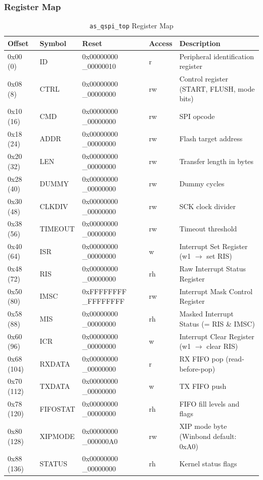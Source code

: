 \subsubsection{Register Map}

\begin{table}[H]
\caption{\texttt{as\_qspi\_top} Register Map}
\label{tab:asqspitop_regmap}
\centering
\begin{tabularx}{\textwidth}{|l|l| X| l| X|}
  \hline
  Offset & Symbol & Reset & Access & Description \\
  \hline\hline
  0x00 (0)   & ID        & 0x00000000 \_00000010 & r   & Peripheral identification register \\
  \hline
  0x08 (8)   & CTRL      & 0x00000000 \_00000000 & rw  & Control register (START, FLUSH, mode bits) \\
  \hline
  0x10 (16)  & CMD       & 0x00000000 \_00000000 & rw  & SPI opcode \\
  \hline
  0x18 (24)  & ADDR      & 0x00000000 \_00000000 & rw  & Flash target address \\
  \hline
  0x20 (32)  & LEN       & 0x00000000 \_00000000 & rw  & Transfer length in bytes \\
  \hline
  0x28 (40)  & DUMMY     & 0x00000000 \_00000000 & rw  & Dummy cycles \\
  \hline
  0x30 (48)  & CLKDIV    & 0x00000000 \_00000000 & rw  & SCK clock divider \\
  \hline
  0x38 (56)  & TIMEOUT   & 0x00000000 \_00000000 & rw  & Timeout threshold \\
  \hline
  0x40 (64)  & ISR       & 0x00000000 \_00000000 & w   & Interrupt Set Register (w1 $\to$ set RIS) \\
  \hline
  0x48 (72)  & RIS       & 0x00000000 \_00000000 & rh  & Raw Interrupt Status Register \\
  \hline
  0x50 (80)  & IMSC      & 0xFFFFFFFF \_FFFFFFFF & rw  & Interrupt Mask Control Register \\
  \hline
  0x58 (88)  & MIS       & 0x00000000 \_00000000 & rh  & Masked Interrupt Status (= RIS \& IMSC) \\
  \hline
  0x60 (96)  & ICR       & 0x00000000 \_00000000 & w   & Interrupt Clear Register (w1 $\to$ clear RIS) \\
  \hline
  0x68 (104) & RXDATA    & 0x00000000 \_00000000 & r   & RX FIFO pop (read-before-pop) \\
  \hline
  0x70 (112) & TXDATA    & 0x00000000 \_00000000 & w   & TX FIFO push \\
  \hline
  0x78 (120) & FIFOSTAT  & 0x00000000 \_00000000 & rh  & FIFO fill levels and flags \\
  \hline
  0x80 (128) & XIPMODE   & 0x00000000 \_000000A0 & rw  & XIP mode byte (Winbond default: 0xA0) \\
  \hline
  0x88 (136) & STATUS    & 0x00000000 \_00000000 & rh  & Kernel status flags \\
  \hline
\end{tabularx}
\end{table}


